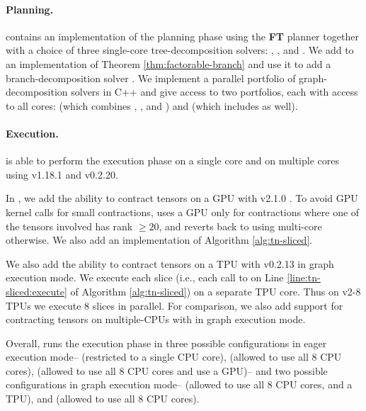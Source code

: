 \paragraph{Planning.} 
 contains an implementation of the planning phase using the \textbf{FT} planner together with a choice of three single-core tree-decomposition solvers:  \cite{Tamaki17},  \cite{HS18}, and  \cite{AMW17}. We add to  an implementation of Theorem \ref{thm:factorable-branch} and use it to add a branch-decomposition solver  \cite{hicks02}.
We implement a parallel portfolio of graph-decomposition solvers in C++ and give  access to two portfolios, each with access to all cores:  (which combines ,  , and ) and  (which includes  as well).

\paragraph{Execution.} 
 is able to perform the execution phase on a single core and on multiple cores using  v1.18.1 and  v0.2.20. 

In , we add the ability to contract tensors on a GPU with  v2.1.0 \cite{ABCCDDDGII16}. To avoid GPU kernel calls for small contractions,  uses a GPU only for contractions where one of the tensors involved has rank $\geq 20$, and reverts back to using multi-core  otherwise. We also add an implementation of Algorithm \ref{alg:tn-sliced}.

We also add the ability to contract tensors on a TPU with  v0.2.13 \cite{jax2018github} in graph execution mode. 
We execute each slice (i.e., each call to  on Line \ref{line:tn-sliced:execute} of Algorithm \ref{alg:tn-sliced}) on a separate TPU core. 
Thus on v2-8 TPUs we execute 8 slices in parallel. 
For comparison, we also add support for contracting tensors on multiple-CPUs with  in graph execution mode.

Overall,  runs the execution phase in three possible configurations in eager execution mode--  (restricted to a single CPU core),  (allowed to use all 8 CPU cores),  (allowed to use all 8 CPU cores and use a GPU)-- and two possible configurations in graph execution mode--  (allowed to use all 8 CPU cores, and a TPU), and  (allowed to use all 8 CPU cores).

